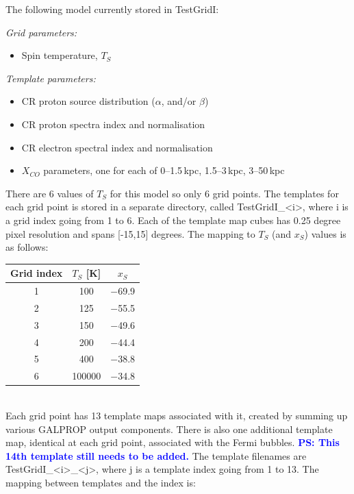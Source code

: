 \documentclass{article}
\newcommand{\ps}[1]{\textcolor{blue}{{\bf PS: #1}}}
\begin{document}
The following model currently stored in TestGridI:

   {\em Grid parameters:}
   \begin{itemize}
      \item Spin temperature, $T_S$
   \end{itemize}

   {\em Template parameters:}
   \begin{itemize}
      \item CR proton source distribution ($\alpha$, and/or $\beta$)
      \item CR proton spectra index and normalisation
      \item CR electron spectral index and normalisation
      \item $X_{CO}$ parameters, one for each of 0--1.5\,kpc, 1.5--3\,kpc, 3--50\,kpc
   \end{itemize}

   There are 6 values of $T_S$ for this model so only 6 grid points.  The
   templates for each grid point is stored in a separate directory, called
   TestGridI\_<i>, where i is a grid index going from 1 to 6. Each of the template map cubes has 0.25 degree pixel resolution and spans [-15,15] degrees. The mapping to  $T_S$ (and $x_{S}$) values is as follows: \\

   \begin{tabular}[h]{c|c|c}
      Grid index & $T_S$ [K] & $x_{S}$\\
      \hline
      1 & 100 & $-$69.9 \\
      2 & 125 & $-$55.5 \\
      3 & 150 & $-$49.6 \\
      4 & 200 & $-$44.4 \\
      5 & 400 & $-$38.8 \\
      6 & 100000 & $-$34.8 \\
   \end{tabular}\\

   Each grid point has 13 template maps associated with it, created by summing up various GALPROP
   output components.  There is also one additional template map, identical at each grid point, associated with the Fermi bubbles. \ps{This 14th template still needs to be added.}
   The template filenames are TestGridI\_<i>\_<j>, where j
   is a template index going from 1 to 13.  The mapping between templates and
   the index is:\\
\end{document}
